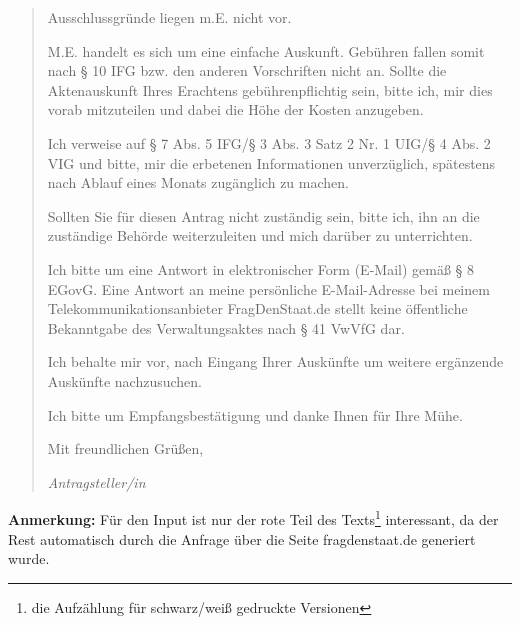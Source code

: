 \documentclass[draft,10pt,oneside]{scrartcl}
\begin{document}
\begin{quote}
	Ausschlussgründe liegen m.E. nicht vor.

	M.E. handelt es sich um eine einfache Auskunft. Gebühren fallen somit  nach
	§ 10 IFG bzw. den anderen Vorschriften nicht an.  Sollte die Aktenauskunft
	Ihres Erachtens gebührenpflichtig sein, bitte ich, mir dies vorab
	mitzuteilen und dabei die Höhe der Kosten anzugeben.

	Ich verweise auf § 7 Abs. 5 IFG/§ 3 Abs. 3 Satz 2 Nr. 1 UIG/§ 4 Abs. 2 VIG
	und bitte, mir die erbetenen Informationen unverzüglich, spätestens nach
	Ablauf eines Monats zugänglich zu machen.

	Sollten Sie für diesen Antrag nicht zuständig sein, bitte ich, ihn an die
	zuständige Behörde weiterzuleiten und mich darüber zu unterrichten.

	Ich bitte um eine Antwort in elektronischer Form (E-Mail) gemäß § 8 EGovG.
	Eine Antwort an meine persönliche E-Mail-Adresse bei meinem
	Telekommunikationsanbieter FragDenStaat.de stellt keine öffentliche
	Bekanntgabe des Verwaltungsaktes nach § 41 VwVfG dar.

	Ich behalte mir vor, nach Eingang Ihrer Auskünfte um weitere ergänzende
	Auskünfte nachzusuchen.

	Ich bitte um Empfangsbestätigung und danke Ihnen für Ihre Mühe.

	Mit freundlichen Grüßen,

	\textit{Antragsteller/in}
\end{quote}

\textbf{Anmerkung:} Für den Input ist nur der rote Teil des Texts\footnote{die
Aufzählung für schwarz/weiß gedruckte Versionen} interessant, da der Rest
automatisch durch die Anfrage über die Seite fragdenstaat.de generiert wurde.
\end{document}
